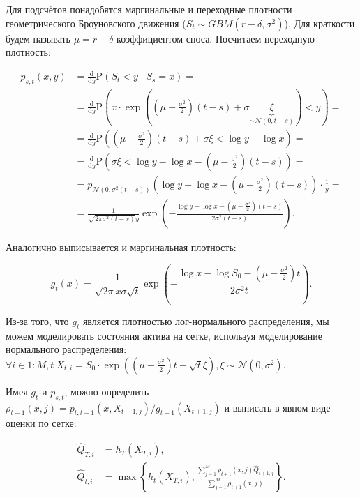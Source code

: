 \documentclass[specialist,
               substylefile = ../spbu.rtx,
               subf,href,colorlinks=true, 12pt]{disser}
\newcommand{\prob}[1]{\mathrm{P}\left(#1\right)}
\begin{document}
Для подсчётов понадобятся маргинальные и переходные плотности геометрического Броуновского движения ($S_t \sim GBM\left(r - \delta, \sigma^2\right)$). Для краткости будем называть $\mu = r - \delta$ коэффициентом сноса. Посчитаем переходную плотность:

\begin{align*}
    p_{s, t}\left(x, y\right) &= \frac{\mathrm d}{\mathrm dy} \prob{S_t < y \middle\vert S_s = x} = \\
    &= \frac{\mathrm d}{\mathrm dy} \prob{x\cdot\exp\left(\left(\mu - \frac{\sigma^2}{2}\right)\left(t - s\right) + \sigma\underbrace{\xi}_{\sim\mathcal N\left(0, t - s\right)}\right) < y} =  \\
    &= \frac{\mathrm d}{\mathrm dy} \prob{\left(\mu - \frac{\sigma^2}{2}\right)\left(t - s\right) + \sigma\xi < \log y - \log x} = \\
    &= \frac{\mathrm d}{\mathrm dy} \prob{\sigma\xi < {\log y - \log x - \left(\mu - \frac{\sigma^2}{2}\right)\left(t - s\right)}} = \\
    &= p_{\mathcal N\left(0, \sigma^2\left(t - s\right)\right)}\left(\log y - \log x - \left(\mu - \frac{\sigma^2}{2}\right)\left(t - s\right)\right)\cdot \frac{1}{y} = \\
    &= \frac{1}{\sqrt{2\pi\sigma^2\left(t - s\right)}y}\exp\left(-\frac{\log y - \log x - \left(\mu - \frac{\sigma^2}{2}\right)\left(t - s\right)}{2\sigma^2\left(t-s\right)}\right).
\end{align*}

Аналогично выписывается и маргинальная плотность:

$$g_t\left(x\right) = \frac{1}{\sqrt{2\pi}x\sigma\sqrt{t}}\exp\left(-\frac{\log x - \log S_0 - \left(\mu - \frac{\sigma^2}{2}\right)t}{2\sigma^2t}\right).$$

Из-за того, что $g_t$ является плотностью лог-нормального распределения, мы можем моделировать состояния актива на сетке, используя моделирование нормального распределения: $\forall i \in 1\mathbin : M, t\: X_{t, i} = S_0\cdot\exp\left(\left(\mu-\frac{\sigma^2}{2}\right)t + \sqrt t \xi\right), \xi\sim\mathcal N\left(0, \sigma^2\right)$.

Имея $g_t$ и $p_{s, t}$, можно определить $\rho_{t+1}\left(x, j\right) = p_{t, t+1}\left(x, X_{t+1, j}\right) / g_{t+1}\left(X_{t+1, j}\right)$ и выписать в явном виде оценки по сетке:

\[\begin{aligned}
\hat Q _{T, i} &= h_T\left( X_{T, i}\right), \\
\hat Q _{t, i} &= \max\left\lbrace h_t\left( X_{T, i}\right), \frac{\sum_{j=1}^M \rho_{t+1}\left(x, j\right) \hat Q_{t+1, j}}{\sum_{j=1}^M \rho_{t+1}\left(x, j\right)}\right\rbrace.\end{aligned}\]
\end{document}
